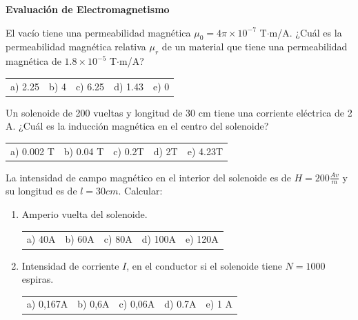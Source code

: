 \documentclass{exam}
\newcommand{\m}[5]{
  \begin{tabular}{p{3cm} p{3cm} p{3cm} p{3cm} p{3cm}}
a) #1 &b) #2 &c) #3 &d) #4 &e) #5 \\ 
  \end{tabular}
}
\begin{document}
\begin{center}
    \textbf{\large Evaluación de Electromagnetismo}
\end{center}

\begin{questions}

\question[1] El vacío tiene una permeabilidad magnética $\mu_0 = 4\pi \times 10^{-7}$ T$\cdot$m/A. ¿Cuál es la permeabilidad magnética relativa $\mu_r$ de un material que tiene una permeabilidad magnética de $1.8 \times 10^{-5}$ T$\cdot$m/A?

\m{2.25}{4}{6.25}{1.43}{0}


\question[1] Un solenoide de 200 vueltas y longitud de 30 cm tiene una corriente eléctrica de 2 A. ¿Cuál es la inducción magnética en el centro del solenoide?

\m {0.002 T}{0.04 T}{0.2T}{2T}{4.23T}

 \question[2] La intensidad de campo magnético en el interior del solenoide es de $H=200\frac{Av}{m}$ y su longitud es de $l=30cm$. Calcular:
    \begin{enumerate}
        \item Amperio vuelta del solenoide.
        
        \m{40A}{60A}{80A}{100A}{120A}
        
        \item Intensidad de corriente $I$, en el conductor si el solenoide  tiene $N=1000$ espiras.
        
        \m{0,167A}{0,6A }{0,06A}{0.7A}{1 A}
    \end{enumerate}

\end{questions}
\end{document}
